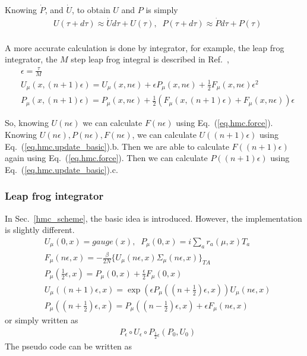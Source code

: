 Knowing $\dot{P}$, and $\dot {U}$, to obtain $U$ and $P$ is simply
\begin{equation}
\begin{split}
&U(\tau+d\tau)\approx \dot{U}d\tau + U(\tau),\;\;P(\tau+d\tau)\approx \dot{P}d\tau + P(\tau)\\
\end{split}
\end{equation}

A more accurate calculation is done by integrator, for example, the leap frog integrator, the $M$ step leap frog integral is described in Ref.~\cite{latticeqcdbook2010},
\begin{subequations}
\begin{eqnarray}
&\epsilon = \frac{\tau}{M}\\
&U_{\mu}(x,(n+1)\epsilon)=U_{\mu}(x,n\epsilon)+\epsilon P_{\mu}(x,n\epsilon)+\frac{1}{2}F_{\mu}(x,n\epsilon)\epsilon ^2\\
&P_{\mu}(x,(n+1)\epsilon)=P_{\mu}(x,n\epsilon)+\frac{1}{2}\left(F_{\mu}(x,(n+1)\epsilon)+F_{\mu}(x,n\epsilon)\right)\epsilon
\end{eqnarray}
\label{eq.hmc.update_basic}
\end{subequations}

So, knowing $U(n\epsilon)$ we can calculate $F(n\epsilon)$ using Eq.~(\ref{eq.hmc.force}).
Knowing $U(n\epsilon),P(n\epsilon),F(n\epsilon)$, we can calculate $U((n+1)\epsilon)$ using Eq.~(\ref{eq.hmc.update_basic}).b.
Then we are able to calculate $F((n+1)\epsilon)$ again using Eq.~(\ref{eq.hmc.force}).
Then we can calculate $P((n+1)\epsilon)$ using Eq.~(\ref{eq.hmc.update_basic}).c.


\subsubsection{\label{Leap frog}Leap frog integrator}

In Sec.~\ref{hmc_scheme}, the basic idea is introduced. However, the implementation is slightly different.
\begin{subequations}
\begin{eqnarray}
&U_{\mu}(0,x)=gauge(x),\;\;P_{\mu}(0,x)=i\sum _{a}r_a(\mu,x)T_a\\
&F_{\mu}(n\epsilon,x)=-\frac{\beta}{2N}\{U_{\mu}(n\epsilon,x)\Sigma _{\mu}(n\epsilon,x)\}_{TA}\\
&P_{\mu}(\frac{1}{2}\epsilon,x)=P_{\mu}(0,x)+\frac{\epsilon}{2}F_{\mu}(0,x)\\
&U_{\mu}((n+1)\epsilon,x)=\exp \left(\epsilon P_{\mu}((n+\frac{1}{2})\epsilon,x)\right)U_{\mu}(n\epsilon,x)\\
&P_{\mu}((n+\frac{1}{2})\epsilon,x)=P_{\mu}((n-\frac{1}{2})\epsilon,x)+\epsilon F_{\mu}(n\epsilon,x)
\end{eqnarray}
\label{eq.hmc.update_leapfrog}
\end{subequations}
or simply written as
\begin{equation}
\begin{split}
&P_{\epsilon}\circ U_{\epsilon}\circ P_{\frac{1}{2}\epsilon}\left(P_0,U_0\right)
\end{split}
\label{eq.hmc.update_leapfrog2}
\end{equation}
The pseudo code can be written as

